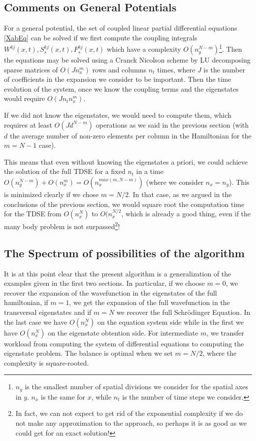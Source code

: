 \documentclass[11pt, a4paper]{article} %
\begin{document}
\subsection{Comments on General Potentials}
For a general potential, the set of coupled linear partial differential equations \eqref{XabEq} can be solved if we first compute the coupling integrals $W^{kj}(x,t),S^{kj}_s(x,t),F^{kj}_s(x,t)$ which have a complexity $O(n_y^{N-m})$\footnote{$n_y$ is the smallest number of spatial divisions we consider for the spatial axes in $y$. $n_x$ is the same for $x$, while $n_t$ is the number of time steps we consider.}. Then the equations may be solved using a Cranck Nicolson scheme by LU decomposing sparse matrices of $O(Jn_x^m)$ rows and columns $n_t$ times, where $J$ is the number of coefficients in the expansion we consider to be important. Then the time evolution of the system, once we know the coupling terms and the eigenstates would require $O(Jn_tn_x^m)$.

If we did not know the eigenstates, we would need to compute them, which requires at least $O(Jd^{N-m})$ operations as we said in the previous section (with $d$ the average number of non-zero elements per column in the Hamiltonian for the $m=N-1$ case).

This means that even without knowing the eigenstates a priori, we could achieve the solution of the full TDSE for a fixed $n_t$ in a time $O(n_y^{N-m})+O(n_x^{m})=O(n_x^{max(m, N-m)})$ (where we consider $n_x=n_y$). This is minimized clearly if we chose $m=N/2$. In that case, as we argued in the conclusions of the previous section, we would square root the computation time for the TDSE from $O(n_x^{N})$ to $O(n_x^{N/2}$, which is already a good thing, even if the many body problem is not surpassed\footnote{In fact, we can not expect to get rid of the exponential complexity if we do not make any approximation to the approach, so perhaps it is as good as we could get for an exact solution!}!

\subsection{The Spectrum of possibilities of the algorithm}
It is at this point clear that the present algorithm is a generalization of the examples given in the first two sections. In particular, if we choose $m=0$, we recover the expansion of the wavefunction in the eigenstates of the full hamiltonian, if $m=1$, we get the expansion of the full wavefunction in the transversal eigenstates and if $m=N$ we recover the full Schrödinger Equation. In the last case we have $O(n_x^N)$ on the equation system side while in the first we have $O(n_x^N)$ on the eigenstate obtention side. For intermediate $m$, we transfer workload from computing the system of differential equations to computing the eigenstate problem. The balance is optimal when we set $m=N/2$, where the complexity is square-rooted.
\end{document}
